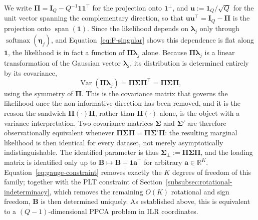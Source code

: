 We write $\bm{\Pi}=\mathbf{I}_Q-Q^{-1}\mathbf{1}\mathbf{1}^\top$ for the projection onto $\mathbf{1}^\perp$, and $\mathbf{u}:=\mathbf{1}_Q/\sqrt{Q}$ for the unit vector spanning the complementary direction, so that $\mathbf{u}\mathbf{u}^\top=\mathbf{I}_Q-\bm{\Pi}$ is the projection onto $\operatorname{span}(\mathbf{1})$. Since the likelihood depends on $\bm{\lambda}_j$ only through $\operatorname{softmax}(\bm{\eta}_j)$, and Equation~\eqref{eq:F-singular} shows this dependence is flat along $\mathbf{1}$, the likelihood is in fact a function of $\bm{\Pi}\bm{\lambda}_j$ alone. Because $\bm{\Pi}\bm{\lambda}_j$ is a linear transformation of the Gaussian vector $\bm{\lambda}_j$, its distribution is determined entirely by its covariance,
\begin{equation}
\operatorname{Var}(\bm{\Pi}\bm{\lambda}_j)=\bm{\Pi}\bm{\Sigma}\bm{\Pi}^\top=\bm{\Pi}\bm{\Sigma}\bm{\Pi},
\end{equation}
using the symmetry of $\bm{\Pi}$. This is the covariance matrix that governs the likelihood once the non-informative direction has been removed, and it is the reason the sandwich $\bm{\Pi}(\cdot)\bm{\Pi}$, rather than $\bm{\Pi}(\cdot)$ alone, is the object with a variance interpretation. Two covariance matrices $\bm{\Sigma}$ and $\bm{\Sigma}'$ are therefore observationally equivalent whenever $\bm{\Pi}\bm{\Sigma}\bm{\Pi}=\bm{\Pi}\bm{\Sigma}'\bm{\Pi}$: the resulting marginal likelihood is then identical for every dataset, not merely asymptotically indistinguishable. The identified parameter is thus $\bm{\Sigma}_\perp:=\bm{\Pi}\bm{\Sigma}\bm{\Pi}$, and the loading matrix is identified only up to $\mathbf{B}\mapsto\mathbf{B}+\mathbf{1}\mathbf{a}^\top$ for arbitrary $\mathbf{a}\in\mathbb{R}^K$. Equation~\eqref{eq:gauge-constraint} removes exactly the $K$ degrees of freedom of this family; together with the PLT constraint of Section~\ref{subsubsec:rotational-indeterminacy}, which removes the remaining $O(K)$ rotational and sign freedom, $\mathbf{B}$ is then determined uniquely. As established above, this is equivalent to a $(Q-1)$-dimensional PPCA problem in ILR coordinates.

